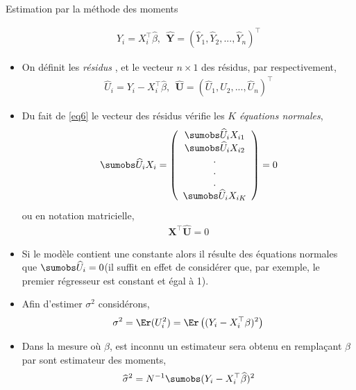 \begin{frame}[allowframebreaks]{Estimation par la méthode des moments}
\begin{itemize}
\begin{align*}
\widehat{Y}_i = X_i^\top\widehat{\beta}, \ \ \widehat{\mathbf{Y}} = (\widehat{Y}_1,  \widehat{Y}_2,..., \widehat{Y}_n)^\top
\end{align*}
\item On définit  les \emph{résidus}  , et le vecteur  $n\times 1$ des résidus, par respectivement,
\begin{align*}
\widehat{U}_i = Y_i - X_i^\top\widehat{\beta}, \ \ \widehat{\mathbf{U}} = (\widehat{U}_1,  \widehat{U}_2,..., \widehat{U}_n)^\top
\end{align*}
\item Du fait de \eqref{eq6} le vecteur des résidus vérifie les $K$  \emph{équations normales},
\begin{align}
\sumobs \widehat{U}_iX_i=
\left(
\begin{array}{c}
\sumobs \widehat{U}_iX_{i1}\\
\sumobs \widehat{U}_iX_{i2}\\
.\\
.\\
.\\
\sumobs \widehat{U}_iX_{iK}
\end{array}
\right)
=0
\label{eq10}
\end{align}
ou en notation matricielle,
\begin{align}
\mathbf{X}^\top\widehat{\mathbf{U}} = 0
\label{eq11}
\end{align}
\item Si le modèle contient une constante alors il résulte des équations normales que $\sumobs \widehat{U}_i = 0$(il suffit en effet de considérer que, par exemple, le premier régresseur est constant et égal à 1).
\item Afin d'estimer $\sigma^2$ considérons,
\begin{align*}
\sigma^2 = \Er(U_i^2)=\Er\left((Y_i - X_i^\top\beta)^2\right)
\end{align*}
\item Dans la mesure où $\beta$, est inconnu un estimateur  sera obtenu en remplaçant $\beta$ par sont estimateur des moments,
\begin{align}
\widehat{\sigma}^2 = N^{-1}\sumobs(Y_i-X_i^\top\widehat{\beta})^2
\label{eq12}
\end{align}
\end{itemize}
\end{frame}
